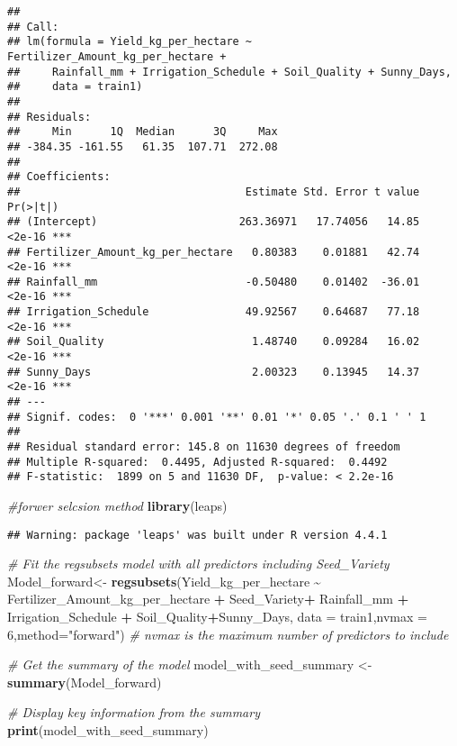 \documentclass[
]{article}
\newenvironment{Shaded}{\begin{snugshade}}{\end{snugshade}}
\newcommand{\AttributeTok}[1]{\textcolor[rgb]{0.13,0.29,0.53}{#1}}
\newcommand{\CommentTok}[1]{\textcolor[rgb]{0.56,0.35,0.01}{\textit{#1}}}
\newcommand{\DecValTok}[1]{\textcolor[rgb]{0.00,0.00,0.81}{#1}}
\newcommand{\FunctionTok}[1]{\textcolor[rgb]{0.13,0.29,0.53}{\textbf{#1}}}
\newcommand{\NormalTok}[1]{#1}
\newcommand{\OtherTok}[1]{\textcolor[rgb]{0.56,0.35,0.01}{#1}}
\newcommand{\SpecialCharTok}[1]{\textcolor[rgb]{0.81,0.36,0.00}{\textbf{#1}}}
\newcommand{\StringTok}[1]{\textcolor[rgb]{0.31,0.60,0.02}{#1}}
\begin{document}
\begin{verbatim}
## 
## Call:
## lm(formula = Yield_kg_per_hectare ~ Fertilizer_Amount_kg_per_hectare + 
##     Rainfall_mm + Irrigation_Schedule + Soil_Quality + Sunny_Days, 
##     data = train1)
## 
## Residuals:
##     Min      1Q  Median      3Q     Max 
## -384.35 -161.55   61.35  107.71  272.08 
## 
## Coefficients:
##                                   Estimate Std. Error t value Pr(>|t|)    
## (Intercept)                      263.36971   17.74056   14.85   <2e-16 ***
## Fertilizer_Amount_kg_per_hectare   0.80383    0.01881   42.74   <2e-16 ***
## Rainfall_mm                       -0.50480    0.01402  -36.01   <2e-16 ***
## Irrigation_Schedule               49.92567    0.64687   77.18   <2e-16 ***
## Soil_Quality                       1.48740    0.09284   16.02   <2e-16 ***
## Sunny_Days                         2.00323    0.13945   14.37   <2e-16 ***
## ---
## Signif. codes:  0 '***' 0.001 '**' 0.01 '*' 0.05 '.' 0.1 ' ' 1
## 
## Residual standard error: 145.8 on 11630 degrees of freedom
## Multiple R-squared:  0.4495, Adjusted R-squared:  0.4492 
## F-statistic:  1899 on 5 and 11630 DF,  p-value: < 2.2e-16
\end{verbatim}

\begin{Shaded}
\begin{Highlighting}[]
\CommentTok{\#forwer selcsion method}
\FunctionTok{library}\NormalTok{(leaps)}
\end{Highlighting}
\end{Shaded}

\begin{verbatim}
## Warning: package 'leaps' was built under R version 4.4.1
\end{verbatim}

\begin{Shaded}
\begin{Highlighting}[]
\CommentTok{\# Fit the regsubsets model with all predictors including Seed\_Variety}
\NormalTok{Model\_forward}\OtherTok{\textless{}{-}} \FunctionTok{regsubsets}\NormalTok{(Yield\_kg\_per\_hectare }\SpecialCharTok{\textasciitilde{}}\NormalTok{ Fertilizer\_Amount\_kg\_per\_hectare }\SpecialCharTok{+}\NormalTok{ Seed\_Variety}\SpecialCharTok{+}\NormalTok{ Rainfall\_mm }\SpecialCharTok{+}\NormalTok{ Irrigation\_Schedule }\SpecialCharTok{+}\NormalTok{ Soil\_Quality}\SpecialCharTok{+}\NormalTok{Sunny\_Days, }\AttributeTok{data =}\NormalTok{ train1,}\AttributeTok{nvmax =} \DecValTok{6}\NormalTok{,}\AttributeTok{method=}\StringTok{"forward"}\NormalTok{)  }\CommentTok{\# nvmax is the maximum number of predictors to include}

\CommentTok{\# Get the summary of the model}
\NormalTok{model\_with\_seed\_summary }\OtherTok{\textless{}{-}} \FunctionTok{summary}\NormalTok{(Model\_forward)}

\CommentTok{\# Display key information from the summary}
\FunctionTok{print}\NormalTok{(model\_with\_seed\_summary)}
\end{Highlighting}
\end{Shaded}
\end{document}
